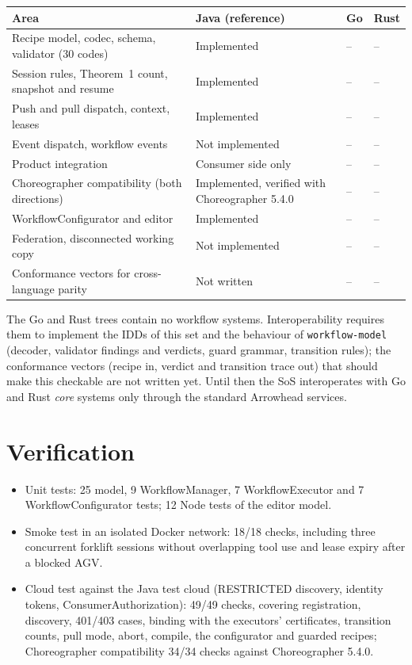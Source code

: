\documentclass[a4paper]{arrowhead}
\begin{document}
{\small
\begin{longtable}{|p{6.6cm}|p{5.0cm}|p{2.1cm}|p{2.1cm}|}

\hline
\rowcolor{gray!33} Area & Java (reference) & Go & Rust \\ \hline
\endhead
Recipe model, codec, schema, validator (30 codes) & Implemented & -- & -- \\ \hline
Session rules, Theorem~1 count, snapshot and resume & Implemented & -- & -- \\ \hline
Push and pull dispatch, context, leases & Implemented & -- & -- \\ \hline
Event dispatch, workflow events & Not implemented & -- & -- \\ \hline
Product integration & Consumer side only & -- & -- \\ \hline
Choreographer compatibility (both directions) & Implemented, verified with Choreographer 5.4.0 & -- & -- \\ \hline
WorkflowConfigurator and editor & Implemented & -- & -- \\ \hline
Federation, disconnected working copy & Not implemented & -- & -- \\ \hline
Conformance vectors for cross-language parity & Not written & -- & -- \\ \hline
\end{longtable}
}

The Go and Rust trees contain no workflow systems. Interoperability requires them to implement the IDDs of this set and
the behaviour of \texttt{workflow-model} (decoder, validator findings and verdicts, guard grammar, transition rules); the
conformance vectors (recipe in, verdict and transition trace out) that should make this checkable are not written yet.
Until then the SoS interoperates with Go and Rust \emph{core} systems only through the standard Arrowhead services.

\section{Verification}
\label{sec:verification}
\begin{itemize}
\item Unit tests: 25 model, 9 WorkflowManager, 7 WorkflowExecutor and 7 WorkflowConfigurator tests; 12 Node tests of the
editor model.
\item Smoke test in an isolated Docker network: 18/18 checks, including three concurrent forklift sessions without
overlapping tool use and lease expiry after a blocked AGV.
\item Cloud test against the Java test cloud (RESTRICTED discovery, identity tokens, ConsumerAuthorization):
49/49 checks, covering registration, discovery, 401/403 cases, binding with the executors' certificates, transition
counts, pull mode, abort, compile, the configurator and guarded recipes; Choreographer compatibility 34/34 checks
against Choreographer 5.4.0.
\end{itemize}
\end{document}

